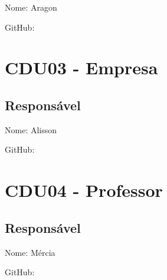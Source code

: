 \documentclass[12pt,a4paper]{report}
\begin{document}
Nome: Aragon

GitHub:



\section{CDU03 - Empresa}

\subsection{Responsável}

Nome: Alisson

GitHub:



\section{CDU04 - Professor}

\subsection{Responsável}

Nome: Mércia

GitHub:







%
\end{document}
